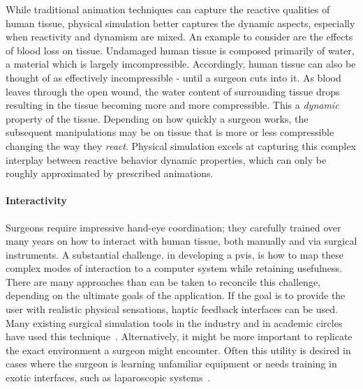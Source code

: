 While traditional animation techniques can capture the reactive
qualities of human tissue, physical simulation better captures the
dynamic aspects, especially when reactivity and dynamism are mixed. An
example to consider are the effects of blood loss on tissue. Undamaged
human tissue is composed primarily of water, a material which is
largely imcompressible. Accordingly, human tissue can also be thought
of as effectively incompressible - until a surgeon cuts into it. As
blood leaves through the open wound, the water content of surrounding
tissue drops resulting in the tissue becoming more and more
compressible. This a \textit{dynamic} property of the
tissue. Depending on how quickly a surgeon works, the subsequent
manipulations may be on tissue that is more or less compressible
changing the way they \textit{react}. Physical simulation excels at
capturing this complex interplay between reactive behavior dynamic
properties, which can only be roughly approximated by prescribed animations.

\paragraph{Interactivity} Surgeons require impressive hand-eye
coordination; they carefully trained over many years on how to
interact with human tissue, both manually and via surgical
instruments. A substantial challenge, in developing a \gls{pvis}, is
how to map these complex modes of interaction to a computer system
while retaining usefulness. There are many approaches than can be
taken to reconcile this challenge, depending on the ultimate goals of
the application. If the goal is to provide the user with realistic
physical sensations, haptic feedback interfaces can be used. Many
existing surgical simulation tools in the industry and in academic
circles have used this technique~\citep{KimCDS:2007,DeKLS:2005,MendoL:2003,LindbT:2007}.  Alternatively,
it might be more important to replicate the exact environment a
surgeon might encounter. Often this utility is desired in cases where
the surgeon is learning unfamiliar equipment or needs training in
exotic interfaces, such as laparoscopic systems~\citep{SUSAC:2002--2014}. 

